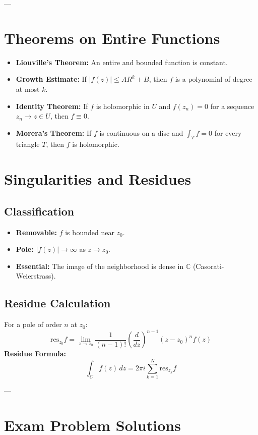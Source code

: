 \documentclass[11pt]{article}
\begin{document}
---

\section{Theorems on Entire Functions}

\begin{itemize}
    \item \textbf{Liouville's Theorem:} An entire and bounded function is constant.
    \item \textbf{Growth Estimate:} If $|f(z)| \le A R^k + B$, then $f$ is a polynomial of degree at most $k$.
    \item \textbf{Identity Theorem:} If $f$ is holomorphic in $U$ and $f(z_n) = 0$ for a sequence $z_n \to z \in U$, then $f \equiv 0$.
    \item \textbf{Morera's Theorem:} If $f$ is continuous on a disc and $\int_{T} f = 0$ for every triangle $T$, then $f$ is holomorphic.
\end{itemize}


\section{Singularities and Residues}

\subsection*{Classification}
\begin{itemize}
    \item \textbf{Removable:} $f$ is bounded near $z_0$.
    \item \textbf{Pole:} $|f(z)| \to \infty$ as $z \to z_0$.
    \item \textbf{Essential:} The image of the neighborhood is dense in $\mathbb{C}$ (Casorati-Weierstrass).
\end{itemize}

\subsection*{Residue Calculation}
For a pole of order $n$ at $z_0$:
$$\text{res}_{z_0} f = \lim_{z \to z_0} \frac{1}{(n-1)!} \left(\frac{d}{dz}\right)^{n-1} (z-z_0)^n f(z)$$
\textbf{Residue Formula:}
$$\int_{C} f(z) \, dz = 2\pi i \sum_{k=1}^N \text{res}_{z_k} f$$

---

\section{Exam Problem Solutions}
\end{document}
